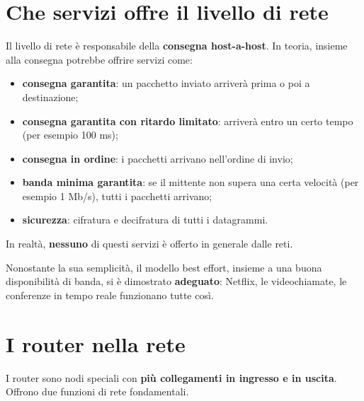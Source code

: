 \section{Che servizi offre il livello di rete}

Il livello di rete è responsabile della \textbf{consegna host-a-host}. In teoria, insieme alla consegna potrebbe
offrire servizi come:

\begin{itemize}
    \item \textbf{consegna garantita}: un pacchetto inviato arriverà prima o poi a destinazione;
    \item \textbf{consegna garantita con ritardo limitato}: arriverà entro un certo tempo (per esempio 100 ms);
    \item \textbf{consegna in ordine}: i pacchetti arrivano nell'ordine di invio;
    \item \textbf{banda minima garantita}: se il mittente non supera una certa velocità (per esempio 1 Mb/s), tutti i
          pacchetti arrivano;
    \item \textbf{sicurezza}: cifratura e decifratura di tutti i datagrammi.
\end{itemize}

In realtà, \textbf{nessuno} di questi servizi è offerto in generale dalle reti.


Nonostante la sua semplicità, il modello best effort, insieme a una buona disponibilità di banda, si è
dimostrato \textbf{adeguato}: Netflix, le videochiamate, le conferenze in tempo reale funzionano tutte così.

\section{I router nella rete}

I router sono nodi speciali con \textbf{più collegamenti in ingresso e in uscita}. Offrono due funzioni di rete
fondamentali.

